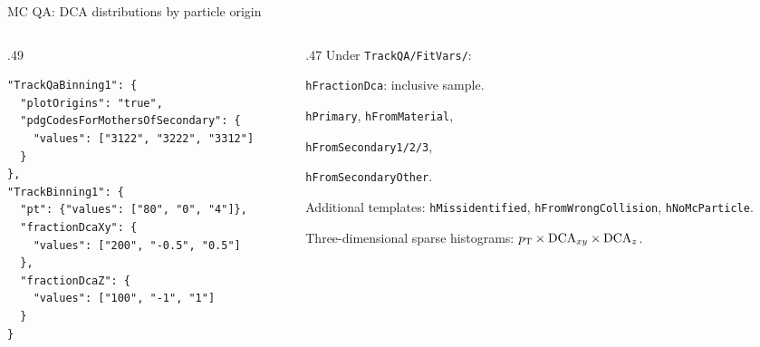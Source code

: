 \begin{frame}[fragile]{MC QA: DCA distributions by particle origin}
 \begin{columns}[T]
 \begin{column}{.49\textwidth}
 \begin{lstlisting}
"TrackQaBinning1": {
  "plotOrigins": "true",
  "pdgCodesForMothersOfSecondary": {
    "values": ["3122", "3222", "3312"]
  }
},
"TrackBinning1": {
  "pt": {"values": ["80", "0", "4"]},
  "fractionDcaXy": {
    "values": ["200", "-0.5", "0.5"]
  },
  "fractionDcaZ": {
    "values": ["100", "-1", "1"]
  }
}
 \end{lstlisting}
 \end{column}
 \begin{column}{.47\textwidth}
 \small Under \texttt{TrackQA/FitVars/}:\par\medskip
 \texttt{hFractionDca}: inclusive sample.\par\medskip
 \texttt{hPrimary}, \texttt{hFromMaterial},\par
 \texttt{hFromSecondary1/2/3},\par
 \texttt{hFromSecondaryOther}.\par\medskip
 Additional templates: \texttt{hMissidentified}, \texttt{hFromWrongCollision}, \texttt{hNoMcParticle}.\par\medskip
 Three-dimensional sparse histograms: $p_{\rm T}\times{\rm DCA}_{xy}\times{\rm DCA}_{z}$.
 \end{column}
 \end{columns}
\end{frame}

